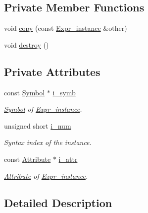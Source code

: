 \subsection*{Private Member Functions}
\begin{CompactItemize}
\item 
void \hyperlink{classgenevalmag_1_1Expr__instance_b30d416247a861949c7341fed475a88b}{copy} (const \hyperlink{classgenevalmag_1_1Expr__instance}{Expr\_\-instance} \&other)
\item 
void \hyperlink{classgenevalmag_1_1Expr__instance_ff5a483a323692e96deedecaff680de0}{destroy} ()
\end{CompactItemize}
\subsection*{Private Attributes}
\begin{CompactItemize}
\item 
const \hyperlink{classgenevalmag_1_1Symbol}{Symbol} $\ast$ \hyperlink{classgenevalmag_1_1Expr__instance_c95a446e179a79d7919c4db67b66b7f0}{i\_\-symb}
\begin{CompactList}\small\item\em \hyperlink{classgenevalmag_1_1Symbol}{Symbol} of \hyperlink{classgenevalmag_1_1Expr__instance}{Expr\_\-instance}. \item\end{CompactList}\item 
unsigned short \hyperlink{classgenevalmag_1_1Expr__instance_f8d85fabc65cf8133ed5b1f7a6fa925b}{i\_\-num}
\begin{CompactList}\small\item\em Syntax index of the instance. \item\end{CompactList}\item 
const \hyperlink{classgenevalmag_1_1Attribute}{Attribute} $\ast$ \hyperlink{classgenevalmag_1_1Expr__instance_3513fb59dae64c17da188dc3ad10fc53}{i\_\-attr}
\begin{CompactList}\small\item\em \hyperlink{classgenevalmag_1_1Attribute}{Attribute} of \hyperlink{classgenevalmag_1_1Expr__instance}{Expr\_\-instance}. \item\end{CompactList}\end{CompactItemize}


\subsection{Detailed Description}


